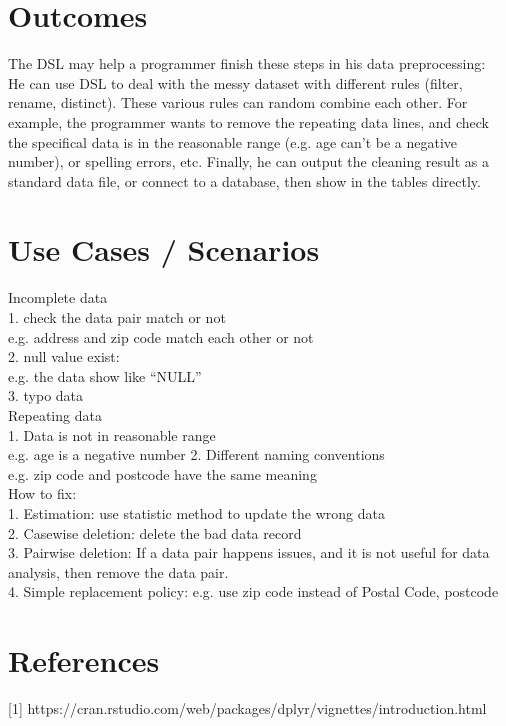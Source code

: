 \documentclass[11pt]{article}
\begin{document}
\section{Outcomes}
\label{sec:outcomes}

The DSL may help a programmer finish these steps in his data preprocessing: \\
He can use DSL to deal with the messy dataset with different rules (filter, rename, distinct). These various rules can random combine each other. For example, the programmer wants to remove the repeating data lines, and check the specifical data is in the reasonable range (e.g. age can’t be a negative number), or spelling errors, etc. Finally, he can output the cleaning result as a standard data file, or connect to a database, then show in the tables directly. 




\section{Use Cases / Scenarios}

\label{sec:examples}

    Incomplete data \\
    1. check the data pair match or not\\
	e.g.  address and zip code match each other or not\\
    2. null value exist:\\
	e.g.  the data show like “NULL”\\
 3. typo data\\

Repeating data\\
   1. Data is not in reasonable range\\
    e.g. age is a negative number
2. Different naming conventions\\
 e.g. zip code and postcode have the same meaning\\


How to fix:\\
 1. Estimation: use statistic method to update the wrong data\\
2. Casewise deletion: delete the bad data record\\
3. Pairwise deletion: If a data pair happens issues, and it is not useful for data analysis, then remove the data pair.\\
4. Simple replacement policy:  e.g. use zip code instead of Postal Code, postcode\\





\section*{References}


[1] https://cran.rstudio.com/web/packages/dplyr/vignettes/introduction.html
\end{document}
